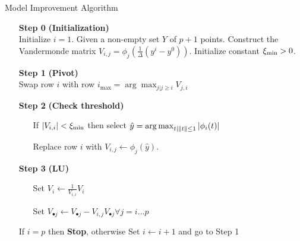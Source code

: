 \begin{algorithm}[H]
    \caption{Model Improvement Algorithm}
    \label{model_improving_algorithm}
    \begin{itemize}
        \item[\textbf{Step 0}] \textbf{(Initialization)} \\
            Initialize $i=1$.
            Given a non-empty set $Y$ of $p+1$ points. 
            Construct the Vandermonde matrix $V_{i,j} = \phi_j(\frac 1 {\Delta}(y^i - y^0))$.
			Initialize constant $\xi_{\text{min}} > 0$.
        \item[\textbf{Step 1}] \textbf{(Pivot)} \\
            Swap row $i$ with row $i_{\max} = \arg \max_{j|j\ge i} V_{j,i} $
        
        \item[\textbf{Step 2}] \textbf{(Check threshold)} \begin{itemize}
                \item[] If $|V_{i,i}| < \xi_{\text{min}}$ then select \label{next_point} $\hat y = \operatorname*{arg\,max}_{t | \|t\|\le 1} |\phi_i(t)|$
                \item[] Replace row $i$ with $V_{i, j} \gets \phi_j(\hat y)$.
            \end{itemize}
        
        \item[\textbf{Step 3}] \textbf{(LU)} \begin{itemize}
                \item[] Set $V_i \gets \frac{1}{V_{i,i}} V_i$
                \item[] Set $V_{\bullet j} \gets V_{\bullet j} - V_{i,j} V_{\bullet j} \forall j=i \ldots p$
            \end{itemize}
            If $i = p$ then \textbf{Stop}, otherwise Set $i \gets i+1$ and go to Step 1
    \end{itemize}
\end{algorithm}
% 
% 
% 


